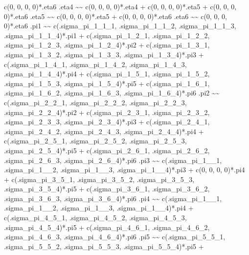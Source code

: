 \documentclass[
]{book}
\newenvironment{Shaded}{\begin{snugshade}}{\end{snugshade}}
\newcommand{\StringTok}[1]{\textcolor[rgb]{0.31,0.60,0.02}{#1}}
\begin{document}
\begin{Shaded}
\begin{Highlighting}[]
\StringTok{    c(0, 0, 0, 0)*.eta6}
\StringTok{.eta4 \textasciitilde{}\textasciitilde{}}
\StringTok{    c(0, 0, 0, 0)*.eta4 +}
\StringTok{    c(0, 0, 0, 0)*.eta5 +}
\StringTok{    c(0, 0, 0, 0)*.eta6}
\StringTok{.eta5 \textasciitilde{}\textasciitilde{}}
\StringTok{    c(0, 0, 0, 0)*.eta5 +}
\StringTok{    c(0, 0, 0, 0)*.eta6}
\StringTok{.eta6 \textasciitilde{}\textasciitilde{}}
\StringTok{    c(0, 0, 0, 0)*.eta6}
\StringTok{.pi1 \textasciitilde{}\textasciitilde{}}
\StringTok{    c(.sigma\_pi\_1\_1\_1, .sigma\_pi\_1\_1\_2, .sigma\_pi\_1\_1\_3, .sigma\_pi\_1\_1\_4)*.pi1 +}
\StringTok{    c(.sigma\_pi\_1\_2\_1, .sigma\_pi\_1\_2\_2, .sigma\_pi\_1\_2\_3, .sigma\_pi\_1\_2\_4)*.pi2 +}
\StringTok{    c(.sigma\_pi\_1\_3\_1, .sigma\_pi\_1\_3\_2, .sigma\_pi\_1\_3\_3, .sigma\_pi\_1\_3\_4)*.pi3 +}
\StringTok{    c(.sigma\_pi\_1\_4\_1, .sigma\_pi\_1\_4\_2, .sigma\_pi\_1\_4\_3, .sigma\_pi\_1\_4\_4)*.pi4 +}
\StringTok{    c(.sigma\_pi\_1\_5\_1, .sigma\_pi\_1\_5\_2, .sigma\_pi\_1\_5\_3, .sigma\_pi\_1\_5\_4)*.pi5 +}
\StringTok{    c(.sigma\_pi\_1\_6\_1, .sigma\_pi\_1\_6\_2, .sigma\_pi\_1\_6\_3, .sigma\_pi\_1\_6\_4)*.pi6}
\StringTok{.pi2 \textasciitilde{}\textasciitilde{}}
\StringTok{    c(.sigma\_pi\_2\_2\_1, .sigma\_pi\_2\_2\_2, .sigma\_pi\_2\_2\_3, .sigma\_pi\_2\_2\_4)*.pi2 +}
\StringTok{    c(.sigma\_pi\_2\_3\_1, .sigma\_pi\_2\_3\_2, .sigma\_pi\_2\_3\_3, .sigma\_pi\_2\_3\_4)*.pi3 +}
\StringTok{    c(.sigma\_pi\_2\_4\_1, .sigma\_pi\_2\_4\_2, .sigma\_pi\_2\_4\_3, .sigma\_pi\_2\_4\_4)*.pi4 +}
\StringTok{    c(.sigma\_pi\_2\_5\_1, .sigma\_pi\_2\_5\_2, .sigma\_pi\_2\_5\_3, .sigma\_pi\_2\_5\_4)*.pi5 +}
\StringTok{    c(.sigma\_pi\_2\_6\_1, .sigma\_pi\_2\_6\_2, .sigma\_pi\_2\_6\_3, .sigma\_pi\_2\_6\_4)*.pi6}
\StringTok{.pi3 \textasciitilde{}\textasciitilde{}}
\StringTok{    c(.sigma\_pi\_1\_\_1, .sigma\_pi\_1\_\_2, .sigma\_pi\_1\_\_3, .sigma\_pi\_1\_\_4)*.pi3 +}
\StringTok{    c(0, 0, 0, 0)*.pi4 +}
\StringTok{    c(.sigma\_pi\_3\_5\_1, .sigma\_pi\_3\_5\_2, .sigma\_pi\_3\_5\_3, .sigma\_pi\_3\_5\_4)*.pi5 +}
\StringTok{    c(.sigma\_pi\_3\_6\_1, .sigma\_pi\_3\_6\_2, .sigma\_pi\_3\_6\_3, .sigma\_pi\_3\_6\_4)*.pi6}
\StringTok{.pi4 \textasciitilde{}\textasciitilde{}}
\StringTok{    c(.sigma\_pi\_1\_\_1, .sigma\_pi\_1\_\_2, .sigma\_pi\_1\_\_3, .sigma\_pi\_1\_\_4)*.pi4 +}
\StringTok{    c(.sigma\_pi\_4\_5\_1, .sigma\_pi\_4\_5\_2, .sigma\_pi\_4\_5\_3, .sigma\_pi\_4\_5\_4)*.pi5 +}
\StringTok{    c(.sigma\_pi\_4\_6\_1, .sigma\_pi\_4\_6\_2, .sigma\_pi\_4\_6\_3, .sigma\_pi\_4\_6\_4)*.pi6}
\StringTok{.pi5 \textasciitilde{}\textasciitilde{}}
\StringTok{    c(.sigma\_pi\_5\_5\_1, .sigma\_pi\_5\_5\_2, .sigma\_pi\_5\_5\_3, .sigma\_pi\_5\_5\_4)*.pi5 +}

\end{Highlighting}
\end{Shaded}
\end{document}
